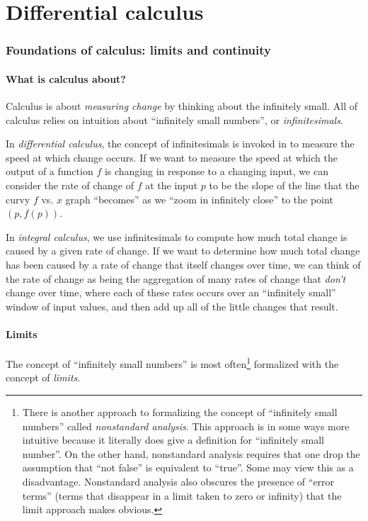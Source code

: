 \documentclass{article}
\begin{document}
\newpage

\part*{Differential calculus}

\section*{Foundations of calculus: limits and continuity}

\subsection*{What is calculus about?}

Calculus is about \textit{measuring change} by thinking about the infinitely small. All of calculus relies on intuition about ``infinitely small numbers'', or \textit{infinitesimals}.

In \textit{differential calculus}, the concept of infinitesimals is invoked in to measure the speed at which change occurs. If we want to measure the speed at which the output of a function $f$ is changing in response to a changing input, we can consider the rate of change of $f$ at the input $p$ to be the slope of the line that the curvy $f$ vs. $x$ graph ``becomes'' as we ``zoom in infinitely close'' to the point $(p, f(p))$.

In \textit{integral calculus}, we use infinitesimals to compute how much total change is caused by a given rate of change. If we want to determine how much total change has been caused by a rate of change that itself changes over time, we can think of the rate of change as being the aggregation of many rates of change that \textit{don't} change over time, where each of these rates occurs over an ``infinitely small'' window of input values, and then add up all of the little changes that result.

\subsection*{Limits}

The concept of ``infinitely small numbers'' is most often\footnote{There is another approach to formalizing the concept of ``infinitely small numbers'' called \textit{nonstandard analysis}. This approach is in some ways more intuitive because it literally does give a definition for ``infinitely small number''. On the other hand, nonstandard analysis requires that one drop the assumption that ``not false'' is equivalent to ``true''. Some may view this as a disadvantage. Nonstandard analysis also obscures the presence of ``error terms'' (terms that disappear in a limit taken to zero or infinity) that the limit approach makes obvious.} formalized with the concept of \textit{limits}. 
\end{document}
